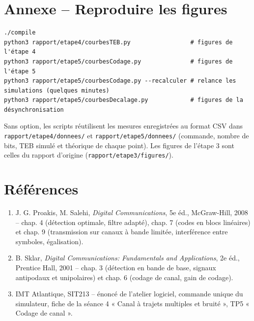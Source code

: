 \documentclass[11pt,a4paper]{article}
\begin{document}
\section*{Annexe -- Reproduire les figures}
\begin{lstlisting}[language={}]
./compile
python3 rapport/etape4/courbesTEB.py                 # figures de l'étape 4
python3 rapport/etape5/courbesCodage.py              # figures de l'étape 5
python3 rapport/etape5/courbesCodage.py --recalculer # relance les simulations (quelques minutes)
python3 rapport/etape5/courbesDecalage.py            # figures de la désynchronisation
\end{lstlisting}
Sans option, les scripts réutilisent les mesures enregistrées au format CSV dans \texttt{rapport/etape4/donnees/} et \texttt{rapport/etape5/donnees/} (commande, nombre de bits, TEB simulé et théorique de chaque point). Les figures de l'étape 3 sont celles du rapport d'origine (\texttt{rapport/etape3/figures/}).

\enlargethispage{3\baselineskip}
\section*{Références}
\begin{enumerate}\small
\item[{[1]}] J. G. Proakis, M. Salehi, \emph{Digital Communications}, 5e éd., McGraw-Hill, 2008 -- chap. 4 (détection optimale, filtre adapté), chap. 7 (codes en blocs linéaires) et chap. 9 (transmission sur canaux à bande limitée, interférence entre symboles, égalisation).
\item[{[2]}] B. Sklar, \emph{Digital Communications: Fundamentals and Applications}, 2e éd., Prentice Hall, 2001 -- chap. 3 (détection en bande de base, signaux antipodaux et unipolaires) et chap. 6 (codage de canal, gain de codage).
\item[{[3]}] IMT Atlantique, SIT213 -- énoncé de l'atelier logiciel, commande unique du simulateur, fiche de la séance 4 « Canal à trajets multiples et bruité », TP5 « Codage de canal ».
\end{enumerate}
\end{document}
